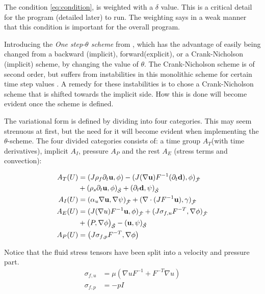 The condition \eqref{eq:condition}, is weighted with a $\delta$ value. This is a critical detail for the program (detailed later) to run. The weighting says in a weak manner that this condition is important for the overall program. \newline

Introducing the \textit{One step-$\theta$ scheme} from \cite{Wick2011}, which has the advantage of easily being changed from a backward (implicit), forward(explicit), or a Crank-Nicholson (implicit) scheme, by changing the value of $\theta$. The Crank-Nicholson scheme is of second order, but suffers from instabilities in this monolithic scheme for certain time step values \cite{Wick2011}. A remedy for these instabilities is to chose a Crank-Nicholson scheme that is shifted towards the implicit side. How this is done will become evident once the scheme is defined.

The variational form is defined by dividing into four categories. This may seem strenuous at first, but the need for it will become evident when implementing the $\theta$-scheme. The four divided categories consists of: a time group $A_T$(with time derivatives), implicit $A_I$, pressure $A_P$ and the rest $A_E$ (stress terms and convection):

\begin{align}
A_T(U) &= (J \rho_f \partial_t \bold{u} , \phi ) - (J (\nabla \bold{u})F^{-1}(\partial_t \bold{d}) , \phi )_{\mathcal{\hat{F}}} \\
	    & + (\rho_s \partial_t \bold{u} , \phi)_{\mathcal{\hat{S}}} + (\partial_t \bold{d} , \psi)_{\mathcal{\hat{S}}}  \\
A_I(U) &= ( \alpha_u \nabla \bold{u}, \nabla \psi)_{\mathcal{\hat{F}}} + (\nabla \cdot (J F^{-1} \bold{u}), \gamma)_{\mathcal{\hat{F}}} \\
A_E(U) &= (J (\nabla u)F^{-1} \bold{u} , \phi )_{\mathcal{\hat{F}}} + ( J \sigma_{f,u} F^{-T} , \nabla \phi )_{\mathcal{\hat{F}}} \\
	    & + \big(P, \nabla \phi \big)_{\mathcal{\hat{S}}} - ( \bold{u} , \psi )_{\mathcal{\hat{S}}} \\
A_P(U) &= \big( J \sigma_{f,p} F^{-T}, \nabla \phi  \big)  	 		
\end{align}

Notice that the fluid stress tensors have been split into a velocity and pressure part. 
\begin{align}
\sigma_{f,u} &= \mu ( \nabla u F^{-1} + F^{-T} \nabla u) \\
\sigma_{f,p} &= -p I
\end{align}

